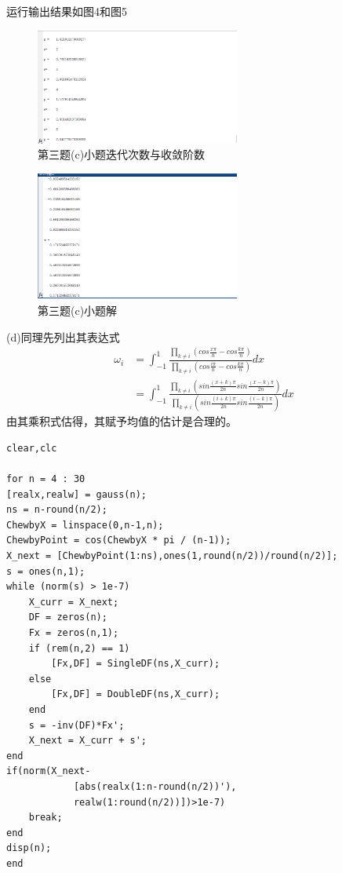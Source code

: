 \documentclass[12pt,a4paper,utf8]{ctexart}
\begin{document}
\begin{enumerate}
\begin{lstlisting}[frame=single]
\end{lstlisting}
运行输出结果如图4和图5
\begin{figure}[htbp]
	\centering
	\includegraphics[width=0.6\textwidth]{image/T3_c_1.png}
	\caption{第三题(c)小题迭代次数与收敛阶数}
\end{figure}
\begin{figure}[htbp]
	\centering
	\includegraphics[width=0.6\textwidth]{image/T3_c_2.png}
	\caption{第三题(c)小题解}
\end{figure}

(d)同理先列出其表达式
\begin{equation}
	\begin{aligned}
		\omega_i &= \int_{-1}^1 \frac{\prod_{k \neq i} (cos\frac{x \pi}{n} - cos\frac{k\pi }{n})}{\prod_{k \neq i} (cos\frac{i \pi}{n} - cos\frac{k\pi }{n})} dx \\
		&= \int_{-1}^1 \frac{\prod_{k \neq i} (sin\frac{(x+k) \pi}{2n}sin\frac{(x-k)\pi }{2n})}{\prod_{k \neq i} (sin\frac{(i+k) \pi}{2n}sin\frac{(i-k)\pi }{2n})} dx
	\end{aligned}
	\nonumber
\end{equation}
由其乘积式估得，其赋予均值的估计是合理的。

\begin{lstlisting}[frame=single]
clear,clc

for n = 4 : 30
[realx,realw] = gauss(n);
ns = n-round(n/2);
ChewbyX = linspace(0,n-1,n);
ChewbyPoint = cos(ChewbyX * pi / (n-1)); 
X_next = [ChewbyPoint(1:ns),ones(1,round(n/2))/round(n/2)];
s = ones(n,1);
while (norm(s) > 1e-7)
	X_curr = X_next;
	DF = zeros(n);
	Fx = zeros(n,1);
	if (rem(n,2) == 1)
		[Fx,DF] = SingleDF(ns,X_curr);
	else
		[Fx,DF] = DoubleDF(ns,X_curr);
	end
	s = -inv(DF)*Fx';
	X_next = X_curr + s';
end
if(norm(X_next- 
			[abs(realx(1:n-round(n/2))'),
			realw(1:round(n/2))])>1e-7)
	break;
end
disp(n);
end


\end{lstlisting}
\end{enumerate}
\end{document}

